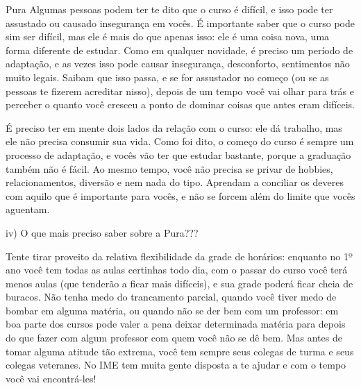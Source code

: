 \begin{subsecao}{Pura}
Algumas pessoas podem ter te dito que o curso é difícil, e isso pode ter assustado
ou causado insegurança em vocês. É importante saber que o curso pode sim ser difícil, mas
ele é mais do que apenas isso: ele é uma coisa nova, uma forma diferente de estudar. Como em 
qualquer novidade, é preciso um período de adaptação, e as vezes isso pode causar insegurança, 
desconforto, sentimentos não muito legais. Saibam que isso passa, e se for assustador no 
começo (ou se as pessoas te fizerem acreditar nisso), depois de um tempo você vai olhar
para trás e perceber o quanto você cresceu a ponto de dominar coisas que antes eram difíceis.

É preciso ter em mente dois lados da relação com o curso: ele dá trabalho, mas ele não
precisa consumir sua vida. Como foi dito, o começo do curso é sempre um processo de adaptação,
e vocês vão ter que estudar bastante, porque a graduação também não é fácil. Ao mesmo tempo, 
você não precisa se privar de hobbies, relacionamentos, diversão e nem nada do tipo. Aprendam 
a conciliar os deveres com aquilo que é importante para vocês, e não se forcem além do limite
que vocês aguentam.

iv) O que mais preciso saber sobre a Pura???

Tente tirar proveito da relativa flexibilidade da grade de horários: enquanto
no 1º ano você tem todas as aulas certinhas todo dia, com o passar do
curso você terá menos aulas (que tenderão a ficar mais difíceis), e sua
grade poderá ficar cheia de buracos. Não tenha medo do trancamento parcial,
quando você tiver medo de bombar em alguma matéria, ou quando não se der bem com
um professor: em boa parte dos cursos pode valer a pena deixar determinada
matéria para depois do que fazer com algum professor com quem você não se dê
bem. Mas antes de tomar alguma atitude tão extrema, você tem sempre seus colegas
de turma e seus colegas veteranes. No IME tem muita gente disposta a te ajudar e
com o tempo você vai encontrá-les!


\end{subsecao}
